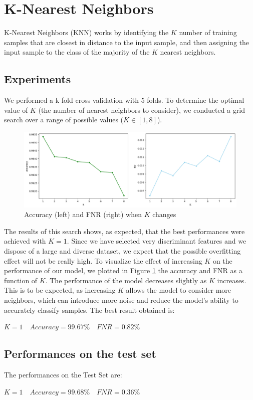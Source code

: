 \documentclass[twocolumn, switch]{article} %
\newcommand\x{0.7}
\begin{document}
\section{K-Nearest Neighbors}
\label{sec:knn}
K-Nearest Neighbors (KNN) works by identifying the $K$ number of training samples that are closest in distance to the input sample, and then assigning the input sample to the class of the majority of the $K$ nearest neighbors.
\subsection{Experiments}
We performed a k-fold cross-validation with 5 folds.
To determine the optimal value of $K$ (the number of nearest neighbors to consider), we conducted a grid search over a range of possible values ($K \in [1, 8]$).
\begin{figure}[ht!]
	\centering
	\includegraphics[width=\x\linewidth]{knn_accuracy_fnr.png}
	\caption{Accuracy (left) and FNR (right) when $K$ changes}
	\label{fig:knntrain}
\end{figure}
The results of this search shows, as expected, that the best performances were achieved with $K=1$. Since we have selected very discriminant features and we dispose of a large and diverse dataset, we expect that the possible overfitting effect will not be really high.
To visualize the effect of increasing $K$ on the performance of our model, we plotted in Figure \ref{fig:knntrain} the accuracy and FNR as a function of $K$. The performance of the model decreases slightly as $K$ increases. This is to be expected, as increasing $K$ allows the model to consider more neighbors, which can introduce more noise and reduce the model's ability to accurately classify samples. The best result obtained is:
\begin{center}
	$K=1 \quad Accuracy=99.67\% \quad FNR=0.82\%$
\end{center}

\subsection{Performances on the test set}
The performances on the Test Set are:
\begin{center}
	$K=1 \quad Accuracy=99.68\% \quad FNR=0.36\%$
\end{center}
\end{document}
